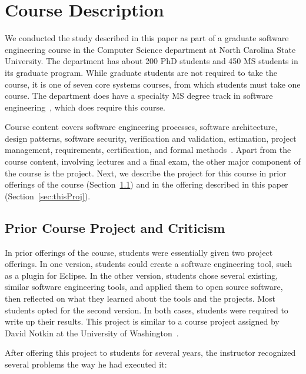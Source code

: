 \documentclass[10pt,conference]{IEEEtran}
\begin{document}
\section{Course Description}

We conducted the study described in this paper as 
part of a graduate software engineering course
in the Computer Science department at 
North Carolina State University.
The department has about 200 PhD students and 450
MS students in its graduate program.
While graduate students are not required to
take the course, it is one of seven core systems
courses, from which students must take one course.
The department does have a specialty MS degree
track in software 
engineering~\cite{mstrack},
which does require this course.

Course content covers software engineering processes,
software architecture, design patterns, software security,
verification and validation, estimation, project management,
requirements, certification, and formal 
methods~\cite{syllabus}.
Apart from the course content, involving lectures and
a final exam, the other
major component of the course is the project.
Next, we describe the project for this course 
in prior offerings of the course (Section~\ref{sec:priorProj})
and in the offering described in this paper (Section~\ref{sec:thisProj}).

\subsection{Prior Course Project and Criticism}\label{sec:priorProj}

In prior offerings of the course,
students were essentially given two project offerings.
In one version, students could create
a software engineering tool, such as a plugin for Eclipse.
In the other version, students chose several existing,
similar software engineering tools, and applied them
to open source software, then reflected 
on what they learned about the tools and the 
projects.
Most students opted for the second version.
In both cases, students were required to write up their results.
This project is similar to a course project
assigned by David Notkin at the 
University of Washington~\cite{gradSEUW}.

After offering this project to students for 
several years, the instructor recognized several
problems the way he had executed it:
\end{document}
